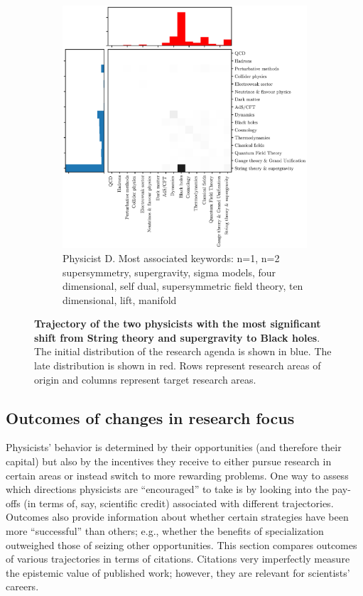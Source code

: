\documentclass{article}
\begin{document}
\begin{figure}[h]
\begin{subfigure}{0.45\textwidth}
    \includegraphics[width=1.15\textwidth]{plots/trajectory_example_K.S.Stelle.1.eps}
    \caption{Physicist D. Most associated keywords: n=1, n=2 supersymmetry, supergravity, sigma models, four dimensional, self dual, supersymmetric field theory, ten dimensional, lift, manifold}
    \label{fig:K.S.Stelle.1}
\end{subfigure}
\caption{\textbf{Trajectory of the two physicists with the most significant shift from String theory and supergravity to Black holes}. The initial distribution of the research agenda is shown in blue. The late distribution is shown in red. Rows represent research areas of origin and columns represent target research areas.}
\label{fig:turns_strings_bh}
\end{figure}


\subsection{\label{sec:outcomes}Outcomes of changes in research focus}

Physicists' behavior is determined by their opportunities (and therefore their capital) but also by the incentives they receive to either pursue research in certain areas or instead switch to more rewarding problems. One way to assess which directions physicists are ``encouraged'' to take is by looking into the pay-offs (in terms of, say, scientific credit) associated with different trajectories. Outcomes also provide information about whether certain strategies have been more ``successful'' than others; e.g., whether the benefits of specialization outweighed those of seizing other opportunities. This section compares outcomes of various trajectories in terms of citations. Citations very imperfectly measure the epistemic value of published work; however, they are relevant for scientists' careers. 
\end{document}
